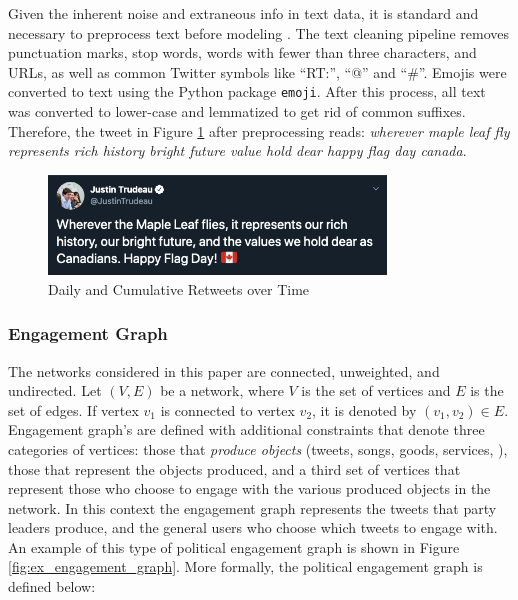 Given the inherent noise and extraneous info in text data, it is
standard and necessary to preprocess text before modeling
\cite{sapul2017trending}. The text cleaning pipeline removes punctuation marks,
stop words, words with fewer than three characters, and URLs, as well as common
Twitter symbols like ``RT:'', ``@'' and ``\#''. Emojis were converted to text
using the Python package \texttt{emoji}. After this process, all text was
converted to lower-case and lemmatized to get rid of common suffixes. Therefore,
the tweet in Figure \ref{fig:tweet_ex} after preprocessing reads: \emph{wherever
maple leaf fly represents rich history bright future value hold dear happy flag
day canada}.

\begin{figure}[h!]
  \centering
  \includegraphics[width=0.8\textwidth]{figures/tweet_ex}
  \caption[Daily and Cumulative Retweets over Time]{Daily and Cumulative Retweets over Time}
  \label{fig:tweet_ex}
\end{figure}

\subsubsection{Engagement Graph}

The networks considered in this paper are connected, unweighted, and undirected.
Let $(V,E)$ be a network, where $V$ is the set of vertices and $E$ is the set of
edges. If vertex $v_1$ is connected to vertex $v_2$, it is denoted by
$(v_1,v_2)\in E$. Engagement graph's are defined with additional constraints
that denote three categories of vertices: those that \emph{produce objects}
(tweets, songs, goods, services, \etc), those that represent the objects
produced, and a third set of vertices that represent those who choose to
engage with the various produced objects in the network. In this context the
engagement graph represents the tweets that party leaders produce, and the
general users who choose which tweets to engage with. An example of this type of
political engagement graph is shown in Figure \ref{fig:ex_engagement_graph}.
More formally, the political engagement graph is defined below:

